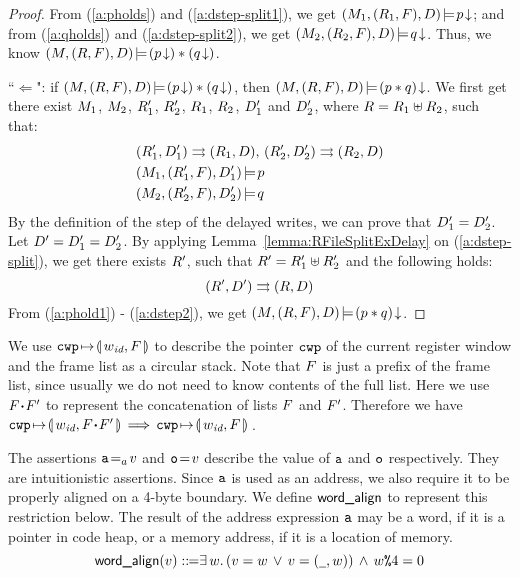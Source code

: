 \begin{proof}
	From (\ref{a:pholds}) and (\ref{a:dstep-split1}), 
	we get ${(M_1, (R_1, F), D)}\!\models\!{{p}\!\downarrow}$; 
	and from (\ref{a:qholds}) and (\ref{a:dstep-split2}), 
	we get ${(M_2, (R_2, F), D)}\!\models\!{{q}\!\downarrow}$.
	Thus, we know
	${(M, (R, F), D)}\!\models\!{({p}\!\downarrow)*({q}\!\downarrow)}$.

	``$\Leftarrow$": if 
	${(M,(R,F),D)}\!\models\!{({p}\!\downarrow)*({q}\!\downarrow)}$,
	then ${(M, (R, F), D)}\!\models\!{{(p*q)}\!\downarrow}$. 
	We first get there exist $M_1$, $M_2$, $R_1'$, 
	$R_2'$, $R_1$, $R_2$, $D_1'$ and $D_2'$, 
	where $R = R_1\uplus R_2$, such that:
	\begin{align}
		& {(R_1', D_1')}\rightrightarrows{(R_1, D)}, \, 
		{(R_2', D_2')}\rightrightarrows{(R_2, D)}
		\label{a:dstep-split} \\
		& {(M_1, (R_1', F), D_1')}\!\models\!{p}
		\label{a:phold1} \\
		& {(M_2, (R_2', F), D_2')}\!\models\!{q}
		\label{a:qhold2}
	\end{align}
	By the definition of the step of the 
	delayed writes, we can prove that 
	$D_1' = D_2'$. Let 
	$D' = D_1' = D_2'$. 
	By applying Lemma~\ref{lemma:RFileSplitExDelay} 
	on (\ref{a:dstep-split}), we get there exists 
	$R'$, such that $R' = R_1'\uplus R_2'$ 
	and the following holds:
	\begin{equation}
		{(R', D')}\rightrightarrows{(R, D)}
		\label{a:dstep2}	
	\end{equation}
	From (\ref{a:phold1}) - (\ref{a:dstep2}), we get 
	${(M, (R, F), D)}\!\models\!{{(p*q)}\!\downarrow}$.
\end{proof}

We use $\texttt{cwp}\!\mapsto\!\llparenthesis\, w_{\textit{id}},F\,\rrparenthesis$ to describe the pointer
$\texttt{cwp}$ of the current register window and the frame
list as a circular stack.
Note that $F$ is just a prefix of the frame list,
since usually we do not need to know contents of
the full list. Here we use $F \!\bm{\cdot}\! F'$ to
represent the concatenation of lists $F$ and $F'$.
Therefore we have
$
\texttt{cwp}\!\mapsto\!\llparenthesis\, w_{\textit{id}},F \!\bm{\cdot}\! F'\,\rrparenthesis \,\Longrightarrow\,
\texttt{cwp}\!\mapsto\!\llparenthesis\, w_{\textit{id}},F\,\rrparenthesis
$\,.


The assertions ${\texttt{a}}\!=_{a}\!{v}$ and ${\texttt{o}}\!=\!{v}$
describe the value of $\texttt{a}$ and $\texttt{o}$ respectively. They are
intuitionistic assertions. Since $\texttt{a}$ is used as an address,
we also require it to be properly aligned on a 4-byte boundary.
We define $\textsf{word\_align}{}$ to represent this restriction below.
The result of the address expression $\texttt{a}$ may be a word, if
it is a pointer in code heap, or a memory address, if it is a location
of memory.
\[
	\textsf{word\_align}{(v)} ::\!\!{=}
	\exists \, w. \,
	(v = w \, \lor \, v = (\underline{\ \,}, w))
	\, \land \, w\texttt{\%}{4} = 0
\]

